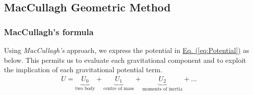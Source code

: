 \begin{multicols}{2}
\subsection{MacCullagh Geometric Method}
\subsubsection{MacCullagh's formula}
Using \textit{MacCullagh's} approach, we express the potential in \hyperref[eq:Potential]{Eq. (\ref*{eq:Potential})} as below. This permits us to evaluate each gravitational component and to exploit the implication of each gravitational potential term. 
\begin{gather}
    U = \underbrace{U_0}_\text{two body} + \underbrace{U_1}_\text{centre of mass}+ \underbrace{U_2}_\text{moments of inertia}+\dots
\end{gather}


\end{multicols}
